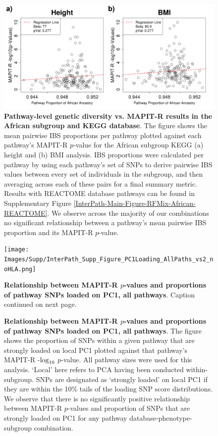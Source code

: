 \documentclass[10pt,a4paper]{article}
\def\log{{\rm log}}
\begin{document}
\begin{figure}[htbp]
\centering
\includegraphics[scale=.35]{Images/Supp/InterPath_Supp_Figure_RFMix_vs2_African_KEGG_noHLA.png}
\caption[TBD]{\textbf{Pathway-level genetic diversity vs. MAPIT-R results in the African subgroup and KEGG database}. The figure shows the mean pairwise IBS proportions per pathway plotted against each pathway's MAPIT-R $p$-value for the African subgroup KEGG (a) height and (b) BMI analysis. IBS proportions were calculated per pathway by using each pathway's set of SNPs to derive pairwise IBS values between every set of individuals in the subgroup, and then averaging across each of these pairs for a final summary metric. Results with REACTOME database pathways can be found in Supplementary Figure \ref{InterPath-Main-Figure-RFMix-African-REACTOME}. We observe across the majority of our combinations no significant relationship between a pathway's mean pairwise IBS proportion and its MAPIT-R $p$-value.}
\label{InterPath-Supp-Figure-RFMix-African-KEGG}
\end{figure}
\clearpage

\setlength{\footskip}{3cm}
\begin{figure}[htbp]
\centering
\vspace*{-2cm}
\texttt{[image: Images/Supp/InterPath\_Supp\_Figure\_PC1Loading\_AllPaths\_vs2\_noHLA.png]}
\caption[TBD]{\textbf{Relationship between MAPIT-R $p$-values and proportions of pathway SNPs loaded on PC1, all pathways}. Caption continued on next page.}
\label{InterPath-Supp-Figure-PC1Loading-AllPaths}
\end{figure}
\clearpage
\setlength{\footskip}{1cm}

\addtocounter{figure}{-1}
\begin{figure} [t!]
  \caption{\textbf{Relationship between MAPIT-R $p$-values and proportions of pathway SNPs loaded on PC1, all pathways}. The figure shows the proportion of SNPs within a given pathway that are strongly loaded on local PC1 plotted against that pathway's MAPIT-R -$\log_{10}$ $p$-value. All pathway sizes were used for this analysis. `Local' here refers to PCA having been conducted within-subgroup. SNPs are designated as `strongly loaded' on local PC1 if they are within the 10\% tails of the loading SNP score distributions. We observe that there is no significantly positive relationship between MAPIT-R $p$-values and proportion of SNPs that are strongly loaded on PC1 for any pathway database-phenotype-subgroup combination.}
\label{InterPath-Supp-Figure-PC1Loading-AllPaths-Caption}
\end{figure}
\clearpage
\end{document}
